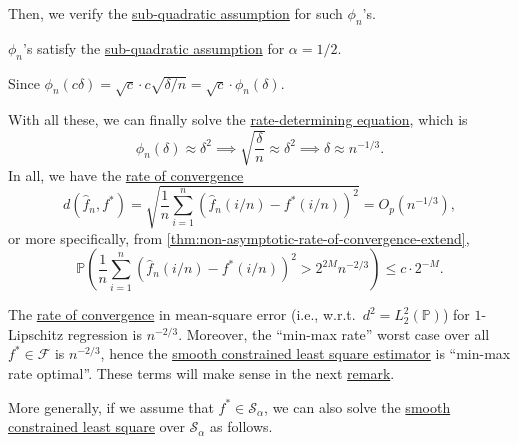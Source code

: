 Then, we verify the \hyperref[def:sub-quadratic-assumption]{sub-quadratic assumption} for such \(\phi _n\)'s.

\begin{claim}
	\(\phi _n\)'s satisfy the \hyperref[def:sub-quadratic-assumption]{sub-quadratic assumption} for \(\alpha = 1 / 2\).
\end{claim}
\begin{explanation}
	Since \(\phi _n (c \delta ) = \sqrt{c} \cdot c \sqrt{\delta / n} = \sqrt{c} \cdot \phi _n(\delta )\).
\end{explanation}

With all these, we can finally solve the \hyperref[def:rate-determining-equation]{rate-determining equation}, which is
\[
	\phi _n (\delta ) \approx \delta ^2
	\implies \sqrt{\frac{\delta}{n}} \approx \delta ^2
	\implies \delta \approx n^{-1 / 3}.
\]
In all, we have the \hyperref[def:rate-of-convergence]{rate of convergence}
\[
	d(\hat{f} _n, f^{\ast} )
	= \sqrt{\frac{1}{n} \sum_{i=1}^{n} \left( \hat{f} _n (i / n) - f^{\ast} (i / n)   \right) ^2 }
	= O_p(n^{-1 / 3}) ,
\]
or more specifically, from \autoref{thm:non-asymptotic-rate-of-convergence-extend},
\[
	\mathbb{P} \left( \frac{1}{n} \sum_{i=1}^{n} \left( \hat{f} _n (i / n) - f^{\ast} (i / n) \right) ^2 > 2^{2M} n^{-2 / 3} \right) \leq c\cdot 2^{-M}.
\]

\begin{remark}
	The \hyperref[def:rate-of-convergence]{rate of convergence} in mean-square error (i.e., w.r.t.\ \(d^2 = L_2^2(\mathbb{P} )\)) for \(1\)-Lipschitz regression is \(n^{-2 / 3}\). Moreover, the ``min-max rate'' worst case over all \(f^{\ast} \in \mathscr{F} \) is \(n^{-2 / 3}\), hence the \hyperref[prb:smooth-LS]{smooth constrained least square estimator} is ``min-max rate optimal''. These terms will make sense in the next \hyperref[rmk:min-max-rate-optimal]{remark}.
\end{remark}

More generally, if we assume that \(f^{\ast} \in \mathcal{S} _{\alpha }\), we can also solve the \hyperref[prb:smooth-LS]{smooth constrained least square} over \(\mathcal{S} _\alpha \) as follows.

